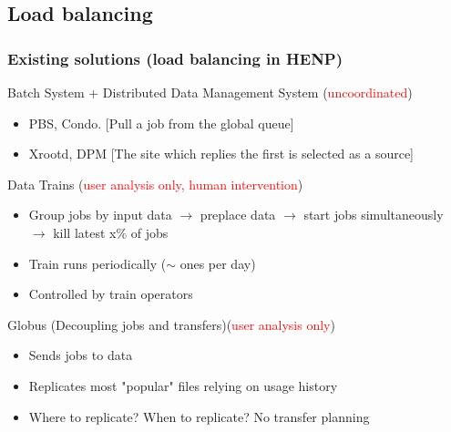 \documentclass{beamer}
\begin{document}
\subsection{Load balancing}
\begin{frame}\frametitle{Existing solutions (load balancing in HENP)} 	
\begin{block}{Batch System + Distributed Data Management System (\textcolor{red}{uncoordinated})}  
		\begin{itemize}
			\item PBS, Condo. [Pull a job from the global queue]
			\item Xrootd, DPM [The site which replies the first is selected as a source] 			
		\end{itemize}
 	\end{block} 	
\begin{block}{Data Trains (\textcolor{red}{user analysis only, human intervention})}	
	 \begin{itemize}
	 \item Group jobs by input data $\longrightarrow$ preplace data $\longrightarrow$ start jobs simultaneously $\longrightarrow$ kill latest x\% of jobs 
	 \item Train runs periodically ($\sim$ ones per day)  
 	 \item Controlled by train operators 
 	  \end{itemize}
\end{block}
\begin{block}{Globus (Decoupling jobs and transfers)(\textcolor{red}{user analysis only})} 	
\begin{itemize}
 	 \item Sends jobs to data  
 	 \item Replicates most "popular" files relying on usage history
 	 \item Where to replicate? When to replicate? No transfer planning
 	 \end{itemize}
\end{block} 	 
\end{frame}
\end{document}
